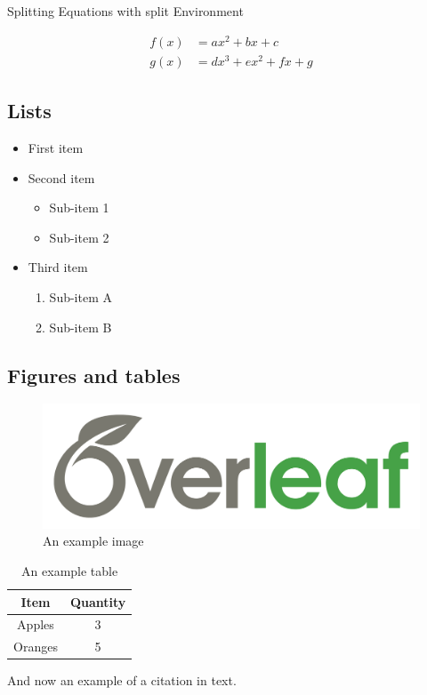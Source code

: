 \documentclass{article}
\begin{document}
Splitting Equations with split Environment

\begin{equation}
    \begin{split}
        f(x) &= ax^2 + bx + c \\
        g(x) &= dx^3 + ex^2 + fx + g
    \end{split}
\end{equation}

\subsection{Lists}

\begin{itemize}
  \item First item
  \item Second item
    \begin{itemize}
      \item Sub-item 1
      \item Sub-item 2
    \end{itemize}
  \item Third item
     \begin{enumerate}
      \item Sub-item A
      \item Sub-item B
    \end{enumerate}
    
\end{itemize}

\subsection{Figures and tables}

\begin{figure}[H]
  \includegraphics[width=\linewidth]{overleaf_wide_colour_light_bg.png}
  \caption{An example image}
\end{figure}

\begin{table}[H]
  \centering
  \begin{tabular}{|c|c|}
    \hline
    Item & Quantity \\
    \hline
    Apples & 3 \\
    Oranges & 5 \\
    \hline
  \end{tabular}
  \caption{An example table}
\end{table}

And now an example of a citation \cite{goossens1994latex} in text.




\end{document}
